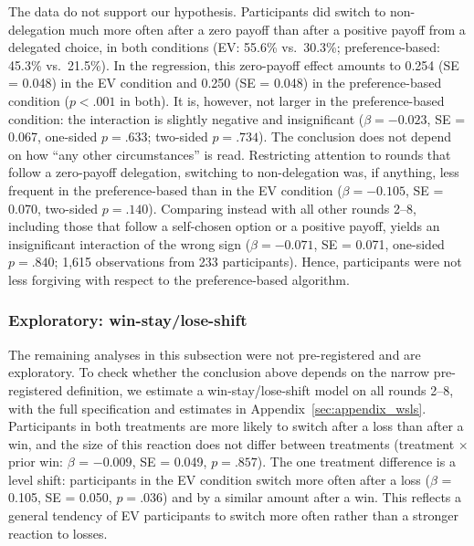\documentclass[a4paper, 12pt, fleqn]{article}
\theoremstyle{hypstyle}
\begin{document}
The data do not support our hypothesis. Participants did switch to non-delegation much more often after a zero payoff than after a positive payoff from a delegated choice, in both conditions (EV: 55.6\% vs.\ 30.3\%; preference-based: 45.3\% vs.\ 21.5\%). In the regression, this zero-payoff effect amounts to 0.254 (SE = 0.048) in the EV condition and 0.250 (SE = 0.048) in the preference-based condition ($p < .001$ in both). It is, however, not larger in the preference-based condition: the interaction is slightly negative and insignificant ($\beta = -0.023$, SE = 0.067, one-sided $p = .633$; two-sided $p = .734$). The conclusion does not depend on how ``any other circumstances'' is read. Restricting attention to rounds that follow a zero-payoff delegation, switching to non-delegation was, if anything, less frequent in the preference-based than in the EV condition ($\beta = -0.105$, SE = 0.070, two-sided $p = .140$). Comparing instead with all other rounds 2--8, including those that follow a self-chosen option or a positive payoff, yields an insignificant interaction of the wrong sign ($\beta = -0.071$, SE = 0.071, one-sided $p = .840$; 1,615 observations from 233 participants). Hence, participants were not less forgiving with respect to the preference-based algorithm.

\subsubsection*{Exploratory: win-stay/lose-shift}
The remaining analyses in this subsection were not pre-registered and are exploratory. To check whether the conclusion above depends on the narrow pre-registered definition, we estimate a win-stay/lose-shift model on all rounds 2--8, with the full specification and estimates in Appendix~\ref{sec:appendix_wsls}. Participants in both treatments are more likely to switch after a loss than after a win, and the size of this reaction does not differ between treatments (treatment $\times$ prior win: $\beta$ = $-0.009$, SE = 0.049, $p = .857$). The one treatment difference is a level shift: participants in the EV condition switch more often after a loss ($\beta$ = 0.105, SE = 0.050, $p = .036$) and by a similar amount after a win. This reflects a general tendency of EV participants to switch more often rather than a stronger reaction to losses.
\end{document}
